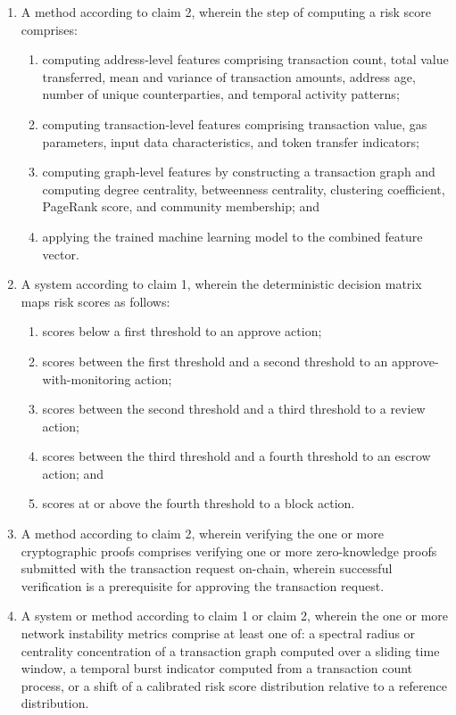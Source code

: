 \documentclass[12pt,a4paper]{article}
\begin{document}
\begin{enumerate}[label=\textbf{\arabic*.}]
\item A method according to claim 2, wherein the step of computing a risk 
score comprises:
\begin{enumerate}[label=(\alph*)]
\item computing address-level features comprising transaction count, total 
value transferred, mean and variance of transaction amounts, address age, 
number of unique counterparties, and temporal activity patterns;
\item computing transaction-level features comprising transaction value, gas 
parameters, input data characteristics, and token transfer indicators;
\item computing graph-level features by constructing a transaction graph and 
computing degree centrality, betweenness centrality, clustering coefficient, 
PageRank score, and community membership; and
\item applying the trained machine learning model to the combined feature 
vector.
\end{enumerate}

\item A system according to claim 1, wherein the deterministic decision 
matrix maps risk scores as follows:
\begin{enumerate}[label=(\alph*)]
\item scores below a first threshold to an approve action;
\item scores between the first threshold and a second threshold to an 
approve-with-monitoring action;
\item scores between the second threshold and a third threshold to a review 
action;
\item scores between the third threshold and a fourth threshold to an escrow 
action; and
\item scores at or above the fourth threshold to a block action.
\end{enumerate}

\item A method according to claim 2, wherein verifying the one or more 
cryptographic proofs comprises verifying one or more zero-knowledge proofs 
submitted with the transaction request on-chain, wherein successful 
verification is a prerequisite for approving the transaction request.

\item A system or method according to claim 1 or claim 2, wherein the one or 
more network instability metrics comprise at least one of: a spectral radius 
or centrality concentration of a transaction graph computed over a sliding 
time window, a temporal burst indicator computed from a transaction count 
process, or a shift of a calibrated risk score distribution relative to a 
reference distribution.


\end{enumerate}
\end{document}
